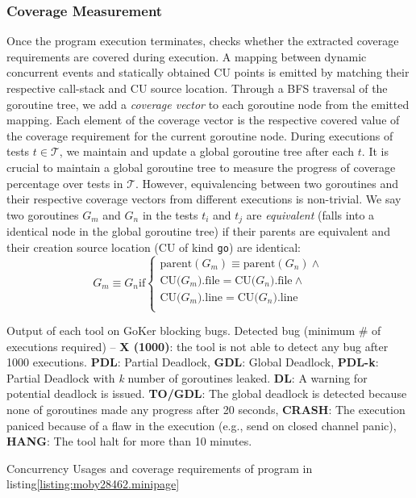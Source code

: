 \subsubsection{Coverage Measurement}
Once the program execution terminates, \goat checks whether the extracted coverage requirements are covered during execution.
%
A mapping between dynamic concurrent events and statically obtained CU points is emitted by matching their respective call-stack and CU source location.
%
Through a BFS traversal of the goroutine tree, we add a \textit{coverage vector} to each goroutine node from the emitted mapping.
%
Each element of the coverage vector is the respective covered value of the coverage requirement for the current goroutine node.
%
During executions of tests $t \in \mathcal{T}$, we maintain and update a global goroutine tree after each $t$.
%
It is crucial to maintain a global goroutine tree to measure the progress of coverage percentage over tests in $\mathcal{T}$.
%
However, equivalencing between two goroutines and their respective coverage vectors from different executions is non-trivial.
%
We say two goroutines $G_m$ and $G_n$ in the tests $t_i$ and $t_j$ are \textit{equivalent} (\ie falls into a identical node in the global goroutine tree) if their parents are equivalent and their creation source location (CU of kind \texttt{go}) are identical:
\begin{equation}
  G_m \equiv G_n   \text{if}
  \begin{cases}
    \text{parent}(G_m) \equiv \text{parent}(G_n)  \wedge \\
    \text{CU(}G_m\text{).file} = \text{CU(}G_n\text{).file}  \wedge\\
    \text{CU(}G_m\text{).line} = \text{CU(}G_n\text{).line} \\
  \end{cases}
\end{equation}


\begin{table}[]
\caption{Output of each tool on GoKer \cite{yuan-gobench-cgo21} blocking bugs. Detected bug (minimum \# of executions required) -- \textbf{X (1000)}: the tool is not able to detect any bug after 1000 executions. \textbf{PDL}: Partial Deadlock, \textbf{GDL}: Global Deadlock, \textbf{PDL-k}: Partial Deadlock with \textit{k} number of goroutines leaked. \textbf{DL}: A warning for potential deadlock is issued. \textbf{TO/GDL}: The global deadlock is detected because none of goroutines made any progress after 20 seconds, \textbf{CRASH}: The execution paniced because of a flaw in the execution (e.g., send on closed channel panic), \textbf{HANG}: The tool halt for more than 10 minutes.}
\centering
\scalebox{0.72}{
    
  }
\label{tab:comparison}
\end{table}






\begin{table}[]
\centering
\caption{Concurrency Usages and coverage requirements of program in listing\ref{listing:moby28462.minipage}}
\scalebox{0.9}{

}
\label{tab:moby_cov_table}
\end{table}
